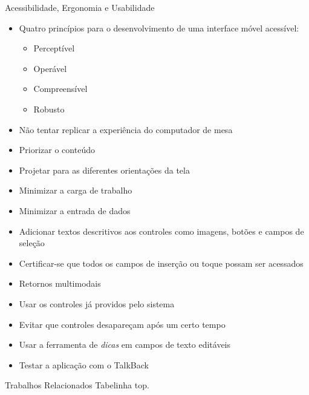 \begin{frame}[allowframebreaks]{Acessibilidade, Ergonomia e Usabilidade}
	\begin{itemize}
		\setlength{\itemsep}{1em}
		\item<1-> Quatro princípios para o desenvolvimento de uma interface móvel acessível:
		\begin{itemize}
			\setlength{\itemsep}{0.5em}
			\item<1-> Perceptível
			\item<1-> Operável
			\item<1-> Compreensível
			\item<1-> Robusto
		\end{itemize}
		\item<1-> Não tentar replicar a experiência do computador de mesa
		\item<1-> Priorizar o conteúdo
		\framebreak
		\item<1-> Projetar para as diferentes orientações da tela
		\item<1-> Minimizar a carga de trabalho
		\item<1-> Minimizar a entrada de dados
		\item<1-> Adicionar textos descritivos aos controles como imagens, botões e campos de seleção
		\item<1-> Certificar-se que todos os campos de inserção ou toque possam ser acessados
		\framebreak
		\item<1-> Retornos multimodais
		\item<1-> Usar os controles já providos pelo sistema
		\item<1-> Evitar que controles desapareçam após um certo tempo
		\item<1-> Usar a ferramenta de \emph{dicas} em campos de texto editáveis
		\item<1-> Testar a aplicação com o TalkBack
	\end{itemize}
\end{frame}

\begin{frame}[allowframebreaks]{Trabalhos Relacionados}
	Tabelinha top.
\end{frame}